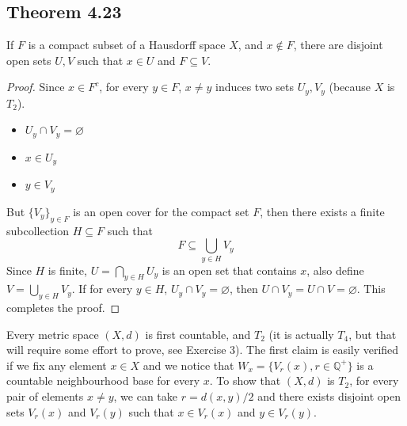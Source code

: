 \documentclass[../../main.tex]{subfiles}
\begin{document}
\subsection{Theorem 4.23}
\begin{wts}
If $F$ is a compact subset of a Hausdorff space $X$, and $x\notin F$, there are disjoint open sets $U, V$ such that $x\in U$ and $F\subseteq V$.
\end{wts}
\begin{proof}
Since $x\in F^c$, for every $y\in F$, $x\neq y$ induces two sets $U_y, V_y$ (because $X$ is $T_2$).
\begin{itemize}
    \item $U_y\cap V_y=\varnothing$
    \item $x\in U_y$
    \item $y\in V_y$
\end{itemize}
But $\{V_y\}_{y\in F}$ is an open cover for the compact set $F$, then there exists a finite subcollection $H\subseteq F$ such that 
\[
F\subseteq \bigcup_{y\in H}V_y
\]
Since $H$ is finite, $U=\bigcap_{y\in H}U_y$ is an open set that contains $x$, also define $V = \bigcup_{y\in H}V_y$. If for every $y\in H$, $U_y\cap V_y=\varnothing$, then $U\cap V_y=U\cap V=\varnothing$. This completes the proof.
\end{proof}
\remark Every metric space $(X,d)$ is first countable, and $T_2$ (it is actually $T_4$, but that will require some effort to prove, see Exercise 3). The first claim is easily verified if we fix any element $x\in X$ and we notice that $W_x=\{V_{r}(x), r\in \mathbb{Q}^+\}$ is a countable neighbourhood base for every $x$. To show that $(X,d)$ is $T_2$, for every pair of elements $x\neq y$, we can take $r=d(x,y)/2$ and there exists disjoint open sets $V_r(x)$ and $V_r(y)$ such that $x\in V_r(x)$ and $y\in V_r(y)$.
\end{document}
